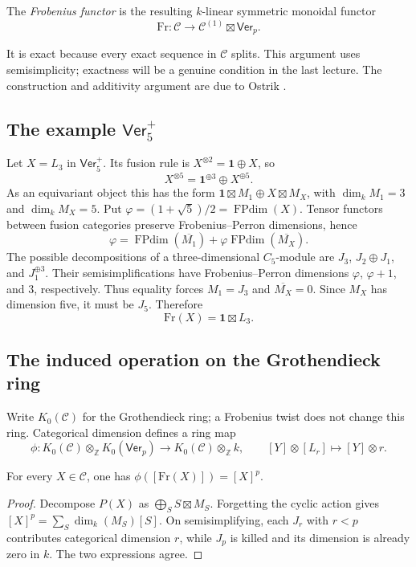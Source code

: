 \begin{definition}
The \emph{Frobenius functor} is the resulting $k$-linear symmetric monoidal
functor
\[
 \mathrm{Fr}:\mathcal C\longrightarrow
 \mathcal C^{(1)}\boxtimes\mathsf{Ver}_p.
\]
\end{definition}
It is exact because every exact sequence in $\mathcal C$ splits. This
argument uses semisimplicity; exactness will be a genuine condition in the
last lecture. The construction and additivity argument are due to Ostrik
\cite[Section 3.3]{OstrikVerlinde}.

\subsection{The example $\mathsf{Ver}_5^+$}
Let $X=L_3$ in $\mathsf{Ver}_5^+$. Its fusion rule is
$X^{\otimes2}=\mathbf1\oplus X$, so
\[
 X^{\otimes5}=\mathbf1^{\oplus3}\oplus X^{\oplus5}.
\]
As an equivariant object this has the form
$\mathbf1\boxtimes M_1\oplus X\boxtimes M_X$, with
$\dim_k M_1=3$ and $\dim_k M_X=5$. Put
$\varphi=(1+\sqrt5)/2=\operatorname{FPdim}(X)$. Tensor functors between
fusion categories preserve Frobenius--Perron dimensions, hence
\[
 \varphi=\operatorname{FPdim}(\overline{M_1})
       +\varphi\operatorname{FPdim}(\overline{M_X}).
\]
The possible decompositions of a three-dimensional $C_5$-module are
$J_3$, $J_2\oplus J_1$, and $J_1^{\oplus3}$. Their semisimplifications have
Frobenius--Perron dimensions $\varphi$, $\varphi+1$, and $3$, respectively.
Thus equality forces $M_1=J_3$ and $\overline{M_X}=0$. Since $M_X$ has
dimension five, it must be $J_5$. Therefore
\[
 \mathrm{Fr}(X)=\mathbf1\boxtimes L_3.
\]

\subsection{The induced operation on the Grothendieck ring}
Write $K_0(\mathcal C)$ for the Grothendieck ring; a Frobenius twist does
not change this ring. Categorical dimension defines a ring map
\[
 \phi:K_0(\mathcal C)\otimes_{\mathbb Z}K_0(\mathsf{Ver}_p)
 \longrightarrow K_0(\mathcal C)\otimes_{\mathbb Z}k,
 \qquad [Y]\otimes[L_r]\longmapsto[Y]\otimes r.
\]
\begin{lemma}\label{lec19-grothendieck-frobenius}
For every $X\in\mathcal C$, one has $\phi([\mathrm{Fr}(X)])=[X]^p$.
\end{lemma}
\begin{proof}
Decompose $P(X)$ as $\bigoplus_S S\boxtimes M_S$. Forgetting the cyclic
action gives $[X]^p=\sum_S\dim_k(M_S)[S]$. On semisimplifying, each
$J_r$ with $r<p$ contributes categorical dimension $r$, while $J_p$ is
killed and its dimension is already zero in $k$. The two expressions agree.
\end{proof}
